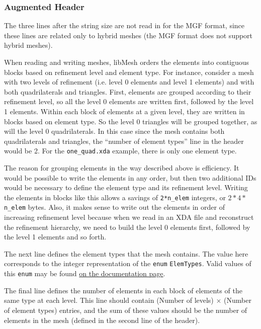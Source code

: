 \documentclass[12pt]{article}
\begin{document}
\subsubsection{Augmented Header}
The three lines after the string size are not read in for the MGF format, since these lines are related only to hybrid meshes (the MGF format does not support hybrid meshes).

When reading and writing meshes, libMesh orders the elements into contiguous blocks based on refinement level and element type.  For instance, consider a mesh with two levels of refinement (i.e. level 0 elements and level 1 elements) and with both quadrilaterals and triangles. First, elements are grouped according to their refinement level, so all the level 0 elements are written first, followed by the level 1 elements. Within each block of elements at a given level, they are written in blocks based on element type. So the level 0 triangles will be grouped together, as will the level 0 quadrilaterals. In this case since the mesh contains both quadrilaterals and triangles, the ``number of element types'' line in the header would be 2.  For the \texttt{one\_quad.xda} example, there is only one element type.

The reason for grouping elements in the way described above is efficiency.  It would be possible to write the elements in any order, but then two additional IDs would be necessary to define the element type and its refinement level.  Writing the elements in blocks like this allows a savings of \texttt{2*n\_elem} integers, or $2*4*$\texttt{n\_elem} bytes. Also, it makes sense to write out the elements in order of increasing refinement level because when we read in an XDA file and reconstruct the refinement hierarchy, we need to build the level 0 elements first, followed by the level 1 elements and so forth.

The next line defines the element types that the mesh contains.  The value here corresponds to the integer representation of the \texttt{enum} \texttt{ElemTypes}.  Valid values of this \texttt{enum} may be found \href{http://libmesh.sourceforge.net/doxygen/namespacelibMeshEnums.html#a145}{on the documentation page}.

The final line defines the number of elements in each block of elements of the same type at each level. This line
should contain (Number of levels) $\times$ (Number of element types) entries,
and the sum of these values should be the number of elements in the mesh
(defined in the second line of the header).
\end{document}
